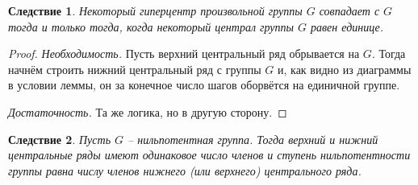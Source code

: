\documentclass{article}
\newtheorem{corollary}{Следствие}[section]
\begin{document}
\begin{corollary}
    Некоторый гиперцентр произвольной группы $G$ совпадает с $G$ тогда и только тогда, когда некоторый централ группы $G$ равен единице.
\end{corollary}
\begin{proof}
    \textit{Необходимость.} Пусть верхний центральный ряд обрывается на $G$. Тогда начнём строить нижний центральный ряд с группы $G$ и, как видно из диаграммы в условии леммы, он за конечное число шагов оборвётся на единичной группе.

    \textit{Достаточность.} Та же логика, но в другую сторону.
\end{proof}

\begin{corollary}
    Пусть $G$ -- нильпотентная группа. Тогда верхний и нижний центральные ряды имеют одинаковое число членов и ступень нильпотентности группы равна числу членов нижнего (или верхнего) центрального ряда.
\end{corollary}
\end{document}

